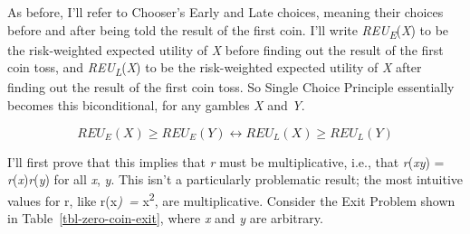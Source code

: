 \documentclass[
  12pt,
  letterpaper,
  DIV=11,
  numbers=noendperiod]{scrreprt}
\begin{document}
As before, I'll refer to Chooser's Early and Late choices, meaning their
choices before and after being told the result of the first coin. I'll
write \emph{REU\textsubscript{E}}(\emph{X}) to be the risk-weighted
expected utility of \emph{X} before finding out the result of the first
coin toss, and \emph{REU\textsubscript{L}}(\emph{X}) to be the
risk-weighted expected utility of \emph{X} after finding out the result
of the first coin toss. So Single Choice Principle essentially becomes
this biconditional, for any gambles \emph{X} and \emph{Y}.

\[
REU_E(X) \geq REU_E(Y) \leftrightarrow REU_L(X) \geq REU_L(Y)
\]

I'll first prove that this implies that \emph{r} must be multiplicative,
i.e., that \emph{r}(\emph{xy}) = \emph{r}(\emph{x})\emph{r}(\emph{y})
for all \emph{x}, \emph{y}. This isn't a particularly problematic
result; the most intuitive values for r, like r(x\emph{)~=}
x\textsuperscript{2}, are multiplicative. Consider the Exit Problem
shown in Table~\ref{tbl-zero-coin-exit}, where \emph{x} and \emph{y} are
arbitrary.

\begin{table}

\caption{\label{tbl-zero-coin-exit}An exit game with exit payout 0.}

\begin{minipage}[t]{0.50\linewidth}



\end{minipage}%
%
\begin{minipage}[t]{0.50\linewidth}



\end{minipage}%

\end{table}%
\end{document}
